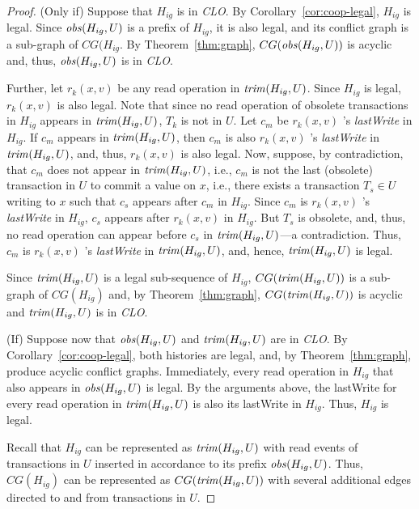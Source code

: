 \documentclass{llncs}
\newcommand{\corref}[1]{Corollary~\ref{cor:#1}}
\newcommand{\id}[1]{\mbox{\textit{#1}}}\newcommand{\res}[1]{\mbox{\textbf{#1}}}
\newcommand{\clo} {\textit{CLO}}
\newcommand{\lastw} {lastWrite}
\newcommand{\obsolete} {obsolete}
\begin{document}
\begin{proof}
(Only if)
Suppose that $H_{ig}$ is in {\clo}.
By \corref{coop-legal}, $H_{ig}$ is legal.
Since $\id{obs}(H_{ig},U)$ is a prefix of $H_{ig}$, it is also legal,
and its conflict
graph is a sub-graph of $CG(H_{ig}$. By Theorem~\ref{thm:graph}, 
$CG(\id{obs}(H_{ig},U))$ is acyclic and, thus, $\id{obs}(H_{ig},U)$ is
in {\clo}.

Further, let $r_k(x,v)$ be any read operation in
$\id{trim}(H_{ig},U)$.
Since $H_{ig}$ is legal,  $r_k(x,v)$ is also legal.
Note that since no read operation of {\obsolete} transactions in
$H_{ig}$ appears in $\id{trim}(H_{ig},U)$, $T_k$ is not in
$U$.  
Let $c_m$ be $r_k(x,v)$ 's \textit{\lastw{}} in $H_{ig}$. 
If $c_m$ appears in  $\id{trim}(H_{ig},U)$, then 
$c_m$ is also $r_k(x,v)$ 's \textit{\lastw{}} in
$\id{trim}(H_{ig},U)$, and, thus, $r_k(x,v)$ is also legal.    
Now, suppose, by contradiction, that $c_m$ does not appear in
$\id{trim}(H_{ig},U)$, i.e., $c_m$ is not the last ({\obsolete})
transaction in $U$ to commit a value on $x$, i.e., there exists a
transaction $T_s\in U$ writing to $x$ such that $c_s$ appears after
$c_m$  in $H_{ig}$.
Since $c_m$ is $r_k(x,v)$ 's \textit{\lastw{}} in $H_{ig}$, $c_s$
appears after $r_k(x,v)$ in $H_{ig}$. 
But $T_s$ is {\obsolete}, and, thus, no read operation 
can appear before $c_s$ in $\id{trim}(H_{ig},U)$---a contradiction.   
Thus, $c_m$ is $r_k(x,v)$ 's \textit{\lastw{}} in
$\id{trim}(H_{ig},U)$, and, hence, $\id{trim}(H_{ig},U)$ is legal.

Since  $\id{trim}(H_{ig},U)$ is a legal sub-sequence of $H_{ig}$,
$CG(\id{trim}(H_{ig},U))$ is a sub-graph of $CG(H_{ig})$ and, by Theorem~\ref{thm:graph}, 
$CG(\id{trim}(H_{ig},U))$ is acyclic and $\id{trim}(H_{ig},U)$ is in {\clo}.

\noindent
(If) Suppose now that $\id{obs}(H_{ig},U)$ and $\id{trim}(H_{ig},U)$ are in {\clo}. 
By  \corref{coop-legal}, both histories are legal, and, by
Theorem~\ref{thm:graph}, produce acyclic conflict graphs.
Immediately, every read operation in $H_{ig}$ that also appears in
$\id{obs}(H_{ig},U)$ is legal.
By the arguments above, the {\lastw} for every read operation in
$\id{trim}(H_{ig},U)$ is also its {\lastw} in $H_{ig}$.
Thus, $H_{ig}$ is legal.

Recall that $H_{ig}$ can be represented as $\id{trim}(H_{ig},U)$ with
read events of transactions in $U$ inserted in accordance to its prefix  $\id{obs}(H_{ig},U)$.
Thus, $CG(H_{ig})$ can be represented as $CG(\id{trim}(H_{ig},U))$ 
with several additional edges directed to and from transactions in
$U$.


\end{proof}
\end{document}
